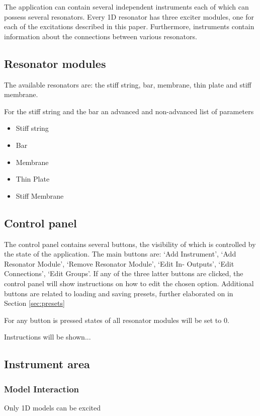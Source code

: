 \documentclass{article}
\begin{document}
The application can contain several independent instruments each of which can possess several resonators. Every 1D resonator has three exciter modules, one for each of the excitations described in this paper. Furthermore, instruments contain information about the connections between various resonators.

\subsection{Resonator modules}
The available resonators are: the stiff string, bar, membrane, thin plate and stiff membrane. 

For the stiff string and the bar an advanced and non-advanced list of parameters  
\begin{itemize}
    \item Stiff string
    \item Bar
    \item Membrane
    \item Thin Plate
    \item Stiff Membrane
\end{itemize}

\subsection{Control panel}
The control panel contains several buttons, the visibility of which is controlled by the state of the application. The main buttons are: `Add Instrument', `Add Resonator Module', `Remove Resonator Module', `Edit In- Outputs', `Edit Connections', `Edit Groups'. If any of the three latter buttons are clicked, the control panel will show instructions on how to edit the chosen option. Additional buttons are related to loading and saving presets, further elaborated on in Section \ref{sec:presets} 

For any  button is pressed states of all resonator modules will be set to 0.

Instructions will be shown... 

\subsection{Instrument area}


\subsubsection{Model Interaction}
Only 1D models can be excited
\end{document}
